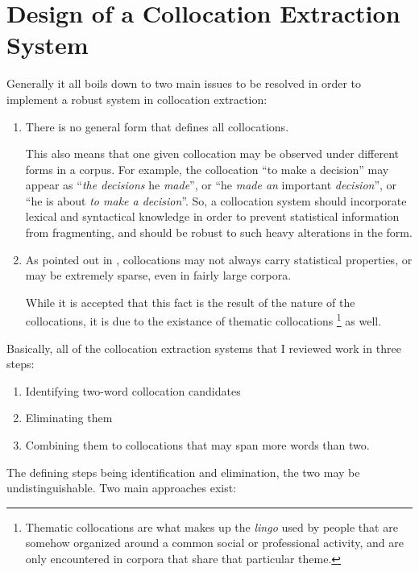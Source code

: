 \documentclass[a4paper,12pt,oneside]{article}
\begin{document}
\section{Design of a Collocation Extraction System}
Generally it all boils down to two main issues to be resolved in order to implement a robust system in collocation extraction:
\begin{enumerate}
\item There is no general form that defines all collocations. 

      This also means that one given collocation may be observed under different forms in a corpus. 
      For example, the collocation ``to make a decision'' may appear as ``\textit{the decisions} he \textit{made}'', or ``he \textit{made an} important \textit{decision}'', or ``he is about \textit{to make a decision}''. 
      So, a collocation system should incorporate lexical and syntactical knowledge in order to prevent statistical information from fragmenting, and should be robust to such heavy alterations in the form.
\item As pointed out in \cite{1118854}, collocations may not always carry statistical properties, or may be extremely sparse, even in fairly large corpora.

      While it is accepted that this fact is the result of the nature of the collocations, it is due to the existance of thematic collocations \footnote{ Thematic collocations are what makes up the \emph{lingo} used by people that are somehow organized around a common social or professional activity, and are only encountered in corpora that share that particular theme.} as well.
\end{enumerate}

Basically, all of the collocation extraction systems that I reviewed work in three steps:
\begin{enumerate}
\item Identifying two-word collocation candidates
\item Eliminating them
\item Combining them to collocations that may span more words than two.
\end{enumerate}

The defining steps being identification and elimination, the two may be undistinguishable. Two main approaches exist:
\end{document}
